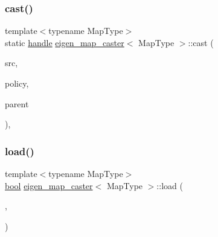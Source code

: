 \subsubsection{\texorpdfstring{cast()}{cast()}}
{\footnotesize\ttfamily template$<$typename Map\+Type$>$ \\
static \mbox{\hyperlink{classhandle}{handle}} \mbox{\hyperlink{structeigen__map__caster}{eigen\+\_\+map\+\_\+caster}}$<$ Map\+Type $>$\+::cast (\begin{DoxyParamCaption}\item[{const Map\+Type \&}]{src,  }\item[{\mbox{\hyperlink{detail_2common_8h_adde72ab1fb0dd4b48a5232c349a53841}{return\+\_\+value\+\_\+policy}}}]{policy,  }\item[{\mbox{\hyperlink{classhandle}{handle}}}]{parent }\end{DoxyParamCaption})\hspace{0.3cm}{\ttfamily [inline]}, {\ttfamily [static]}}

\mbox{\label{structeigen__map__caster_a901a2ca1d09920c5b6cd7a86676960d3}} 
\subsubsection{\texorpdfstring{load()}{load()}}
{\footnotesize\ttfamily template$<$typename Map\+Type$>$ \\
\mbox{\hyperlink{asdl_8h_af6a258d8f3ee5206d682d799316314b1}{bool}} \mbox{\hyperlink{structeigen__map__caster}{eigen\+\_\+map\+\_\+caster}}$<$ Map\+Type $>$\+::load (\begin{DoxyParamCaption}\item[{\mbox{\hyperlink{classhandle}{handle}}}]{,  }\item[{\mbox{\hyperlink{asdl_8h_af6a258d8f3ee5206d682d799316314b1}{bool}}}]{ }\end{DoxyParamCaption})\hspace{0.3cm}{\ttfamily [delete]}}

\mbox{\label{structeigen__map__caster_a792b828f9b4bae6fd5cc16b155cf42b6}} 
